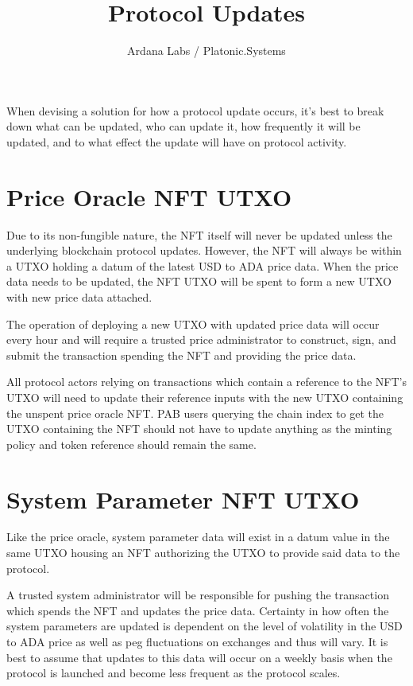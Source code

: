 \documentclass[12pt]{article}
\title{Protocol Updates}
\author{Ardana Labs / Platonic.Systems}
\begin{document}
\maketitle

When devising a solution for how a protocol update occurs, it's best to break down what can be updated, who can update it, how frequently it will be updated, and to what effect the update will have on protocol activity.

\section{Price Oracle NFT UTXO}

Due to its non-fungible nature, the NFT itself will never be updated unless the underlying blockchain protocol updates. However, the NFT will always be within a UTXO holding a datum of the latest USD to ADA price data. When the price data needs to be updated, the NFT UTXO will be spent to form a new UTXO with new price data attached.

The operation of deploying a new UTXO with updated price data will occur every hour and will require a trusted price administrator to construct, sign, and submit the transaction spending the NFT and providing the price data.

All protocol actors relying on transactions which contain a reference to the NFT’s UTXO will need to update their reference inputs with the new UTXO containing the unspent price oracle NFT. PAB users querying the chain index to get the UTXO containing the NFT should not have to update anything as the minting policy and token reference should remain the same.

\section{System Parameter NFT UTXO}
Like the price oracle, system parameter data will exist in a datum value in the same UTXO housing an NFT authorizing the UTXO to provide said data to the protocol.

A trusted system administrator will be responsible for pushing the transaction which spends the NFT and updates the price data. Certainty in how often the system parameters are updated is dependent on the level of volatility in the USD to ADA price as well as peg fluctuations on exchanges and thus will vary. It is best to assume that updates to this data will occur on a weekly basis when the protocol is launched and become less frequent as the protocol scales.
\end{document}
